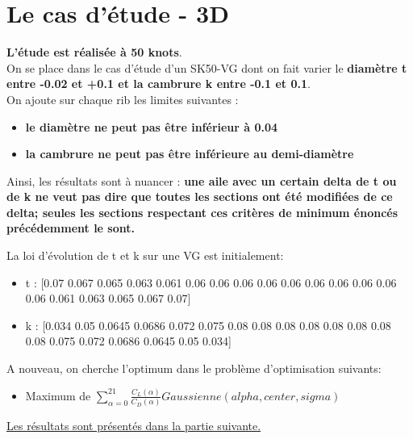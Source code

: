 
\section{Le cas d'étude - 3D} 
\label{sec:Ch2.2}

\textbf{L'étude est réalisée à 50 knots}.\\
On se place dans le cas d'étude d'un SK50-VG dont on fait varier le \textbf{diamètre t entre -0.02 et +0.1 et la cambrure k entre -0.1 et 0.1}. \\
    
    On ajoute sur chaque rib les limites suivantes :
    \begin{itemize}
        \item \textbf{le diamètre ne peut pas être inférieur à 0.04}
        \item \textbf{la cambrure ne peut pas être inférieure au demi-diamètre}
    \end{itemize}

    Ainsi, les résultats sont à nuancer : \textbf{une aile avec un certain delta de t ou de k ne veut pas dire que toutes les sections ont été modifiées de ce delta; seules les sections respectant ces critères de minimum énoncés précédemment le sont.}

La loi d'évolution de t et k sur une VG est initialement:  
\begin{itemize}
    \item t : [0.07 0.067 0.065 0.063 0.061 0.06 0.06  0.06 0.06 0.06  0.06  0.06 0.06 0.06  0.06 0.061 0.063 0.065 0.067 0.07]
    \item k : [0.034 0.05 0.0645 0.0686 0.072 0.075 0.08 0.08 0.08 0.08      0.08 0.08 0.08 0.08 0.075 0.072 0.0686 0.0645 0.05 0.034]
\end{itemize}

    A nouveau, on cherche l'optimum dans le problème d'optimisation suivants:
    \begin{itemize}
        \item Maximum de $\sum_{\alpha = 0}^{21}\frac{C_L(\alpha)}{C_D(\alpha)} Gaussienne(alpha, center, sigma) $
    \end{itemize}
    \underline{Les résultats sont présentés dans la partie suivante.}

